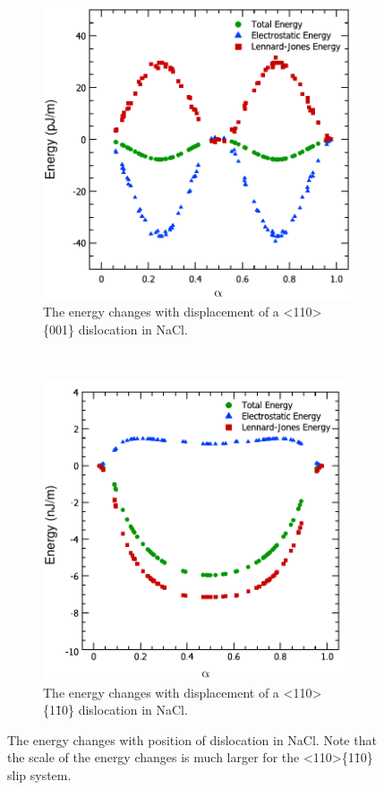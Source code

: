 \begin{figure}
\centering
\begin{subfigure}{0.4\textwidth}
\centering
\includegraphics[width=\textwidth]{NaCl_110_001_U_vs_alpha}
\caption{The energy changes with displacement of a <110>\{001\} dislocation in NaCl.\label{fig:NaCl_110_001_energy_changes}}
\end{subfigure}
~
\begin{subfigure}{0.4\textwidth}
\centering
\includegraphics[width=\textwidth]{NaCl_110_110_U_vs_alpha}
\caption{The energy changes with displacement of a <110>\{1\={1}0\} dislocation in NaCl.\label{fig:NaCl_110_110_energy_changes}}
\end{subfigure}
\caption{The energy changes with position of dislocation in NaCl. Note that the scale of the energy changes is much larger for the <110>\{1\={1}0\} slip system.\label{fig:NaCl_energy_changes}}

\end{figure}
